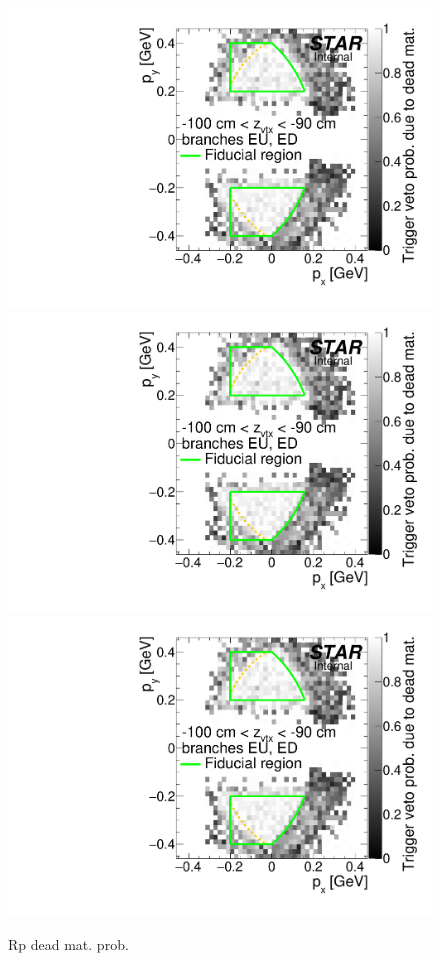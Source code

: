 \begin{figure}[hb]
\caption[RP dead mat prob]{Rp dead mat. prob.}\label{fig:rpDeadMatProb}
\centering
\parbox{0.495\textwidth}{
  \centering
  \includegraphics[width=\linewidth,page=3]{graphics/corrections/mcDeadMatProbPxPy.pdf}\\
  \includegraphics[width=\linewidth,page=5]{graphics/corrections/mcDeadMatProbPxPy.pdf}\\
  \includegraphics[width=\linewidth,page=7]{graphics/corrections/mcDeadMatProbPxPy.pdf}
}
\end{figure}
